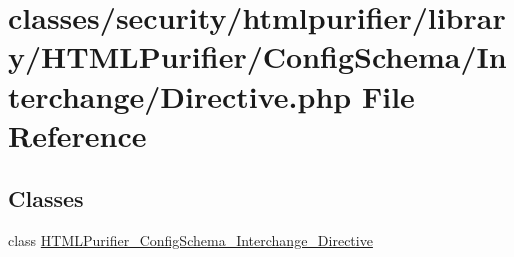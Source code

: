 \hypertarget{Directive_8php}{\section{classes/security/htmlpurifier/library/\+H\+T\+M\+L\+Purifier/\+Config\+Schema/\+Interchange/\+Directive.php File Reference}
\label{Directive_8php}
}
\subsection*{Classes}
\begin{DoxyCompactItemize}
\item 
class \hyperlink{classHTMLPurifier__ConfigSchema__Interchange__Directive}{H\+T\+M\+L\+Purifier\+\_\+\+Config\+Schema\+\_\+\+Interchange\+\_\+\+Directive}
\end{DoxyCompactItemize}
